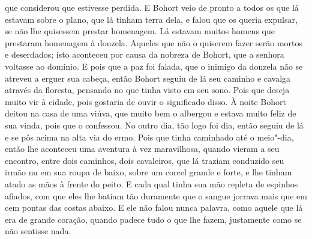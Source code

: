 que considerou que estivesse perdida. E Bohort veio de pronto a todos os que lá
estavam sobre o plano, que lá tinham terra dela, e falou que os queria
expulsar, se não lhe quisessem prestar homenagem.  Lá estavam muitos
homens que prestaram homenagem à donzela. Aqueles que não o quiserem fazer
serão mortos e deserdados; isto aconteceu por causa da nobreza de Bohort, que a
senhora voltasse ao domínio. E pois que a paz foi falada, que o inimigo da
donzela não se atreveu a erguer sua cabeça, então Bohort seguiu de lá seu
caminho e cavalga através da floresta, pensando no que tinha visto em seu sono.
Pois que deseja muito vir à cidade, pois gostaria de ouvir o significado disso.
À noite Bohort deitou na casa de uma viúva, que muito bem o albergou e estava
muito feliz de sua vinda, pois que o confessou. No outro dia, tão logo foi dia,
então seguiu de lá e se pôs acima na alta via do ermo. Pois que tinha caminhado
até o meio"-dia, então lhe aconteceu uma aventura à vez maravilhosa, quando
vieram a seu encontro, entre dois caminhos, dois cavaleiros, que lá traziam
conduzido seu irmão nu em sua roupa de baixo, sobre um corcel grande e forte, e
lhe tinham atado as mãos à frente do peito. E cada qual tinha sua mão repleta
de espinhos afiados, com que eles lhe batiam tão duramente que o sangue jorrava
mais que em cem pontas das costas abaixo. E ele não falou nunca palavra, como
aquele que lá era de grande coração, quando padece tudo o que lhe fazem,
justamente como se não sentisse nada.

